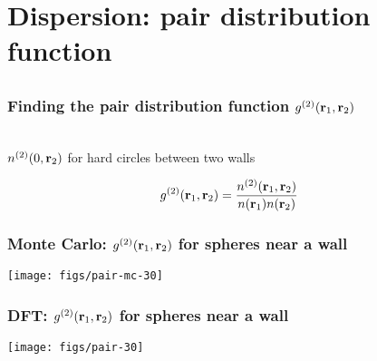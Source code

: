 
\section{Dispersion: pair distribution function}

\subsection{}

\begin{frame}
  \frametitle{Finding the pair distribution function $g^{(2)}(\mathbf{r}_1,\mathbf{r}_2)$}
  \vspace{-0.8em}
  \begin{center}
    \\
    \vspace{-4.0em}
    $n^{(2)}(0,\mathbf{r}_2)$ for hard circles between two walls
  \end{center}
  \begin{align*}
    g^{(2)}(\mathbf{r}_1,\mathbf{r}_2) &= \frac{n^{(2)}(\mathbf{r}_1,\mathbf{r}_2)}{n(\mathbf{r}_1)n(\mathbf{r}_2)}
  \end{align*}
\end{frame}

\begin{frame}
  \frametitle{Monte Carlo: $g^{(2)}(\mathbf{r}_1,\mathbf{r}_2)$ for spheres near a wall}
  \texttt{[image: figs/pair-mc-30]}
\end{frame}

\begin{frame}
  \frametitle{DFT: $g^{(2)}(\mathbf{r}_1,\mathbf{r}_2)$ for spheres near a wall}
  \texttt{[image: figs/pair-30]}
\end{frame}

